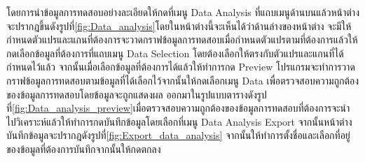โดยการนำข้อมูลการทดสอบอย่างละเอียดให้กดที่เมนู Data Analysis ที่แถบเมนูด้านบนแล้วหน้าต่างจะปรากฎขึ้นดังรูปที่\ref{fig:Data_analysis}โดยในหน้าต่างนี้จะเห็นได้ว่าด้านล่างของหน้าต่าง
จะมีให้กำหนดตัวแปรและแกนที่ต้องการจะวาดกราฟข้อมูลการทดสอบเมื่อกำหนดตัวแปรตามที่ต้องการแล้วให้กดเลือกข้อมูลที่ต้องการที่แถบเมนู Data Selection โดยต้องเลือกให้ตรงกับตัวแปรและแกนที่ได้กำหนดไว้แล้ว
จากนั้นเมื่อเลือกข้อมูลที่ต้องการได้แล้วให้ทำการกด Preview โปรแกรมจะทำการวาดกราฟข้อมูลการทดสอบตามข้อมูลที่ได้เลือกไว้จากนั้นให้กดเลือกเมนู Data เพื่อตรวจสอบความถูกต้องของข้อมูลการทดสอบโดยข้อมูลจะถูกแสดงผล
ออกมาในรูปแบบตารางดังรูปที่\ref{fig:Data_analysis_preview}เมื่อตรวจสอบความถูกต้องของข้อมูลการทดสอบที่ต้องการจะนำไปวิเคราะห์แล้วให้ทำการกดบันทึกข้อมูลโดยเลือกที่เมนู Data Analysis
Export จากนั้นหน้าต่างบันทึกข้อมูลจะปรากฎดังรูปที่\ref{fig:Export_data_analysis} จากนั้นให้ทำการตั้งชื่อและเลือกที่อยู่ของข้อมูลที่ต้องการบันทึกจากนั้นให้กดตกลง


